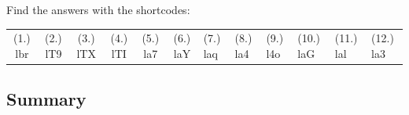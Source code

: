   \label{m39358**end}
  \label{84e7e983e7dc2060d6909eddb5375c22**end}
\par {} Find the answers with the shortcodes:
 \par \begin{tabular}[h]{cccccc}
 (1.) lbr  &  (2.) lT9  &  (3.) lTX  &  (4.) lTI  &  (5.) la7  &  (6.) laY  &  (7.) laq  &  (8.) la4  &  (9.) l4o  &  (10.) laG  &  (11.) lal  &  (12.) la3  & \end{tabular}
    \label{m39368*eip-514}
            \subsection{ Summary}
            \nopagebreak
